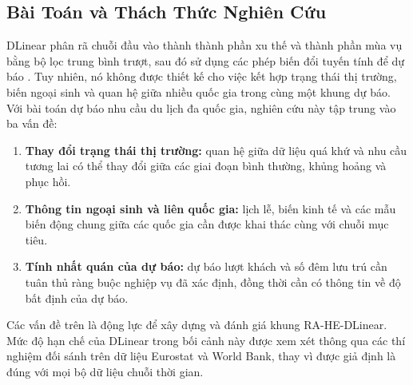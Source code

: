 \documentclass[10pt,journal,compsoc]{IEEEtran}
\begin{document}
\subsection{Bài Toán và Thách Thức Nghiên Cứu}
DLinear phân rã chuỗi đầu vào thành thành phần xu thế và thành phần mùa vụ bằng bộ lọc trung bình trượt, sau đó sử dụng các phép biến đổi tuyến tính để dự báo \cite{zeng2023dlinear}. Tuy nhiên, nó không được thiết kế  cho việc kết hợp trạng thái thị trường, biến ngoại sinh và quan hệ giữa nhiều quốc gia trong cùng một khung dự báo. Với bài toán dự báo nhu cầu du lịch đa quốc gia, nghiên cứu này tập trung vào ba vấn đề:
\begin{enumerate}
    \item \textbf{Thay đổi trạng thái thị trường:} quan hệ giữa dữ liệu quá khứ và nhu cầu tương lai có thể thay đổi giữa các giai đoạn bình thường, khủng hoảng và phục hồi.
    \item \textbf{Thông tin ngoại sinh và liên quốc gia:} lịch lễ, biến kinh tế và các mẫu biến động chung giữa các quốc gia cần được khai thác cùng với chuỗi mục tiêu.
    \item \textbf{Tính nhất quán của dự báo:} dự báo lượt khách và số đêm lưu trú cần tuân thủ ràng buộc nghiệp vụ đã xác định, đồng thời cần có thông tin về độ bất định của dự báo.
\end{enumerate}
Các vấn đề trên là động lực để xây dựng và đánh giá khung RA-HE-DLinear. Mức độ hạn chế của DLinear trong bối cảnh này được xem xét thông qua các thí nghiệm đối sánh trên dữ liệu Eurostat và World Bank, thay vì được giả định là đúng với mọi bộ dữ liệu chuỗi thời gian.
\end{document}
